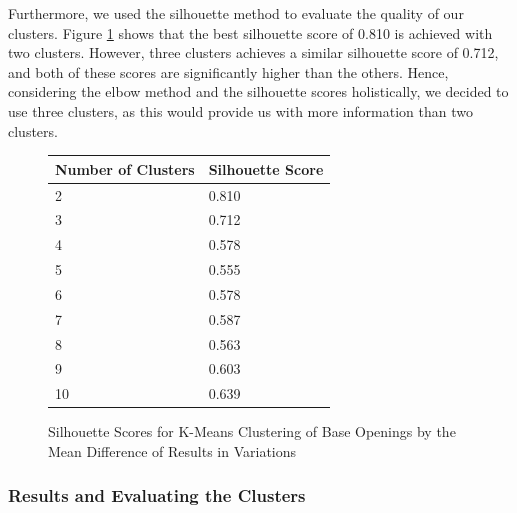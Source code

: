 \documentclass[a4paper, 11pt]{article}
\begin{document}
Furthermore, we used the silhouette method to evaluate the quality of our clusters. Figure \ref{fig:silhouetteScoresForBaseOpeningsClusteredByDifferenceInVariations} shows that the best silhouette score of 0.810 is achieved with two clusters. However, three clusters achieves a similar silhouette score of 0.712, and both of these scores are significantly higher than the others. Hence, considering the elbow method and the silhouette scores holistically, we decided to use three clusters, as this would provide us with more information than two clusters.

\begin{figure}[H]
    \centering
    \caption{Silhouette Scores for K-Means Clustering of Base Openings by the Mean Difference of Results in Variations}
    \label{fig:silhouetteScoresForBaseOpeningsClusteredByDifferenceInVariations}
    \begin{tabular}{| l | l |} 
        \hline
        \bf{Number of Clusters} & \bf{Silhouette Score} \\ [0.5ex] 
        \hline
        2 & 0.810 \\
        \hline
        3 & 0.712 \\
        \hline
        4 & 0.578 \\
        \hline
        5 & 0.555 \\
        \hline
        6 & 0.578 \\
        \hline
        7 & 0.587 \\
        \hline
        8 & 0.563 \\
        \hline
        9 & 0.603 \\
        \hline
        10 & 0.639 \\
        \hline
    \end{tabular}
\end{figure}

\subsubsection{Results and Evaluating the Clusters}
\end{document}
